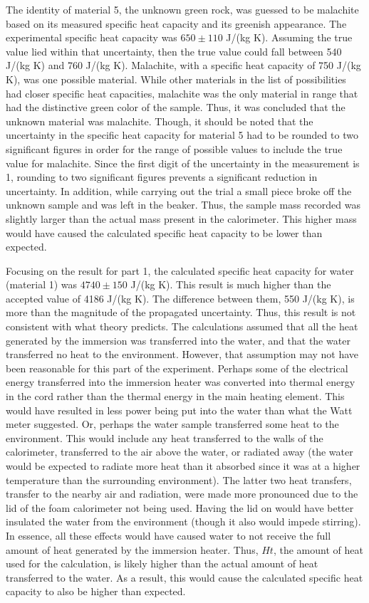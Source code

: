 \documentclass[12pt]{iopart} %
\begin{document}
The identity of material 5, the unknown green rock, was guessed to be malachite based on its measured specific heat capacity and its greenish appearance.
The experimental specific heat capacity was $650 \pm 110$ J/(kg K).
Assuming the true value lied within that uncertainty, then the true value could fall between 540 J/(kg K) and 760 J/(kg K).
Malachite, with a specific heat capacity of 750 J/(kg K), was one possible material.
While other materials in the list of possibilities had closer specific heat capacities, malachite was the only material in range that had the distinctive green color of the sample.
Thus, it was concluded that the unknown material was malachite.
Though, it should be noted that the uncertainty in the specific heat capacity for material 5 had to be rounded to two significant figures in order for the range of possible values to include the true value for malachite.
Since the first digit of the uncertainty in the measurement is 1, rounding to two significant figures prevents a significant reduction in uncertainty.
In addition, while carrying out the trial a small piece broke off the unknown sample and was left in the beaker.
Thus, the sample mass recorded was slightly larger than the actual mass present in the calorimeter.
This higher mass would have caused the calculated specific heat capacity to be lower than expected.

Focusing on the result for part 1, the calculated specific heat capacity for water (material 1) was $4740 \pm 150$ J/(kg K).
This result is much higher than the accepted value of 4186 J/(kg K).
The difference between them, 550 J/(kg K), is more than the magnitude of the propagated uncertainty.
Thus, this result is not consistent with what theory predicts.
The calculations assumed that all the heat generated by the immersion was transferred into the water, and that the water transferred no heat to the environment.
However, that assumption may not have been reasonable for this part of the experiment.
Perhaps some of the electrical energy transferred into the immersion heater was converted into thermal energy in the cord rather than the thermal energy in the main heating element.
This would have resulted in less power being put into the water than what the Watt meter suggested.
Or, perhaps the water sample transferred some heat to the environment.
This would include any heat transferred to the walls of the calorimeter, transferred to the air above the water, or radiated away (the water would be expected to radiate more heat than it absorbed since it was at a higher temperature than the surrounding environment).
The latter two heat transfers, transfer to the nearby air and radiation, were made more pronounced due to the lid of the foam calorimeter not being used.
Having the lid on would have better insulated the water from the environment (though it also would impede stirring).
In essence, all these effects would have caused water to not receive the full amount of heat generated by the immersion heater.
Thus, $Ht$, the amount of heat used for the calculation, is likely higher than the actual amount of heat transferred to the water.
As a result, this would cause the calculated specific heat capacity to also be higher than expected.
\end{document}
